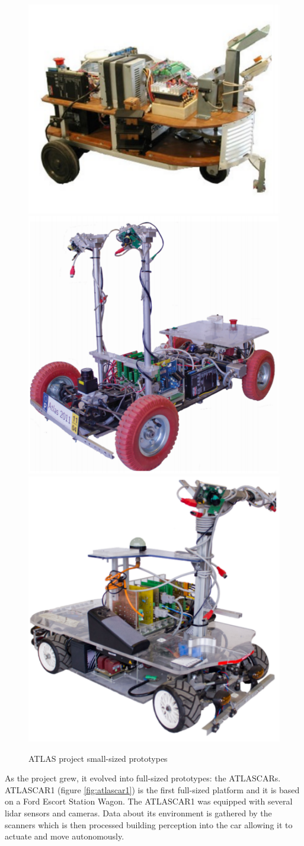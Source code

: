 \begin{figure}[htp]
	
	\centering
	\includegraphics[width=.3\textwidth]{capintro/imgs/atlas1}\hfill
	\includegraphics[width=.3\textwidth]{capintro/imgs/atlas2000}\hfill
	\includegraphics[width=.3\textwidth]{capintro/imgs/atlasmv}
	
	\caption{ATLAS project small-sized prototypes \cite{LARlabs}}
	\label{fig:atlasproto}
	
\end{figure}

As the project grew, it evolved into full-sized prototypes: the ATLASCARs. ATLASCAR1 (figure \ref{fig:atlascar1}) is the first full-sized platform and it is based on a Ford Escort Station Wagon. The ATLASCAR1 was equipped with several \gls{lidar} sensors and cameras. Data about its environment is gathered by the scanners which is then processed building perception into the car allowing it to actuate and move autonomously. 

